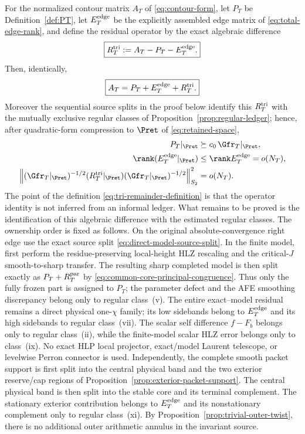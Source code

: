 \begin{proposition}
\label{prop:source-ledger}
For the normalized contour matrix $A_T$ of \eqref{eq:contour-form}, let $P_T$ be
Definition~\ref{def:PT}, let $E_T^{\rm edge}$ be the explicitly assembled edge
matrix of \eqref{eq:total-edge-rank}, and define the residual operator by the
exact algebraic difference
\begin{equation}
\boxed{R_T^{\rm tri}:=A_T-P_T-E_T^{\rm edge}.}
\label{eq:tri-remainder-definition}
\end{equation}
Then, identically,
\begin{equation}
\boxed{A_T=P_T+E_T^{\rm edge}+R_T^{\rm tri}.}
\label{eq:source-ledger}
\end{equation}
Moreover the sequential source splits in the proof below identify this
$R_T^{\rm tri}$ with the mutually exclusive regular classes of
Proposition~\ref{prop:regular-ledger}; hence, after quadratic-form compression
to $\Pret$ of
\eqref{eq:retained-space},
\begin{align}
P_T|_{\Pret}&\succeq c_0\,\Gfr_T|_{\Pret},\notag\\
\rank(E_T^{\rm edge}|_{\Pret})
&\le \rank E_T^{\rm edge}=o(N_T),\notag\\
\left\|
(\Gfr_T|_{\Pret})^{-1/2}(R_T^{\rm tri}|_{\Pret})
(\Gfr_T|_{\Pret})^{-1/2}
\right\|_{S_2}^2
&=o(N_T).
\end{align}
The point of the definition \eqref{eq:tri-remainder-definition} is that the
operator identity is not inferred from an informal ledger.  What remains to be
proved is the identification of this algebraic difference with the estimated
regular classes.  The ownership order is fixed as follows.  On the original
absolute-convergence right edge use the exact source split
\eqref{eq:direct-model-source-split}.  In the finite model, first perform the
residue-preserving local-height HLZ rescaling and the critical-$J$
smooth-to-sharp transfer.  The resulting sharp completed model is then split
exactly as $P_T+R_T^{\rm par}$ by
\eqref{eq:common-core-principal-congruence}.  Thus only the fully frozen part is
assigned to $P_T$; the parameter defect and the AFE smoothing discrepancy
belong only to regular class~(v).  The entire exact--model residual remains a
direct physical one-$\chi$ family; its low sidebands belong to
$E_T^{\rm edge}$ and its high sidebands to regular class~(vii).  The scalar self
difference $f-F_b$ belongs only to regular class~(ii), while the finite-model
scalar HLZ error belongs only to class~(ix).  No exact HLP local projector,
exact/model Laurent telescope, or levelwise Perron connector is used.
Independently, the complete smooth packet support is first split into the
central physical band and the two exterior reserve/cap regions of
Proposition~\ref{prop:exterior-packet-support}.  The central physical band is
then split into the stable core and its terminal complement.  The stationary
exterior contribution belongs to $E_T^{\rm edge}$ and its nonstationary
complement only to regular class~(xi). By
Proposition~\ref{prop:trivial-outer-twist}, there is no additional outer
arithmetic annulus in the invariant source.
\end{proposition}


